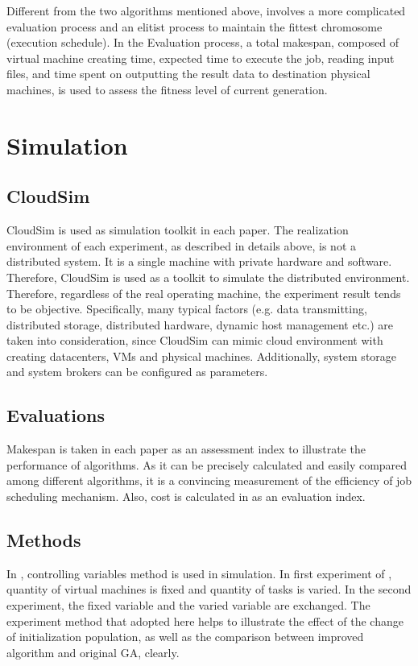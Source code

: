 \documentclass[10pt,twoside,openright,logo]{report}
\begin{document}
Different from the two algorithms mentioned above, \cite{2} involves a more complicated evaluation process and an elitist process to maintain the fittest chromosome (execution schedule). In the Evaluation process, a total makespan, composed of virtual machine creating time, expected time to execute the job, reading input files, and time spent on outputting the result data to destination physical machines, is used to assess the fitness level of current generation.

\section{Simulation}
\subsection{CloudSim}
CloudSim is used as simulation toolkit in each paper.
The realization environment of each experiment, as described in details above, is not a distributed system. It is a single machine with private hardware and software. Therefore, CloudSim is used as a toolkit to simulate the distributed environment. Therefore, regardless of the real operating machine, the experiment result tends to be objective. Specifically, many typical factors (e.g. data transmitting, distributed storage, distributed hardware, dynamic host management etc.) are taken into consideration, since CloudSim can mimic cloud environment with creating datacenters, VMs and physical machines. Additionally, system storage and system brokers can be configured as parameters.

\subsection{Evaluations}
Makespan is taken in each paper as an assessment index to illustrate the performance of algorithms. As it can be precisely calculated and easily compared among different algorithms, it is a convincing measurement of the efficiency of job scheduling mechanism.
Also, cost is calculated in \cite{3} as an evaluation index.

\subsection{Methods}
In \cite{1}, controlling variables method is used in simulation. In first experiment of \cite{1}, quantity of virtual machines is fixed and quantity of tasks is varied. In the second experiment, the fixed variable and the varied variable are exchanged. The experiment method that adopted here helps to illustrate the effect of the change of initialization population, as well as the comparison between improved algorithm and original GA, clearly.
\end{document}
